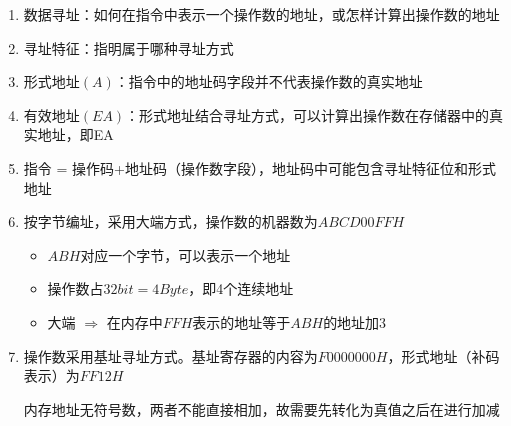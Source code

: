 \documentclass[a4paper,12pt]{article}
\begin{document}
    \begin{enumerate}
        \item 数据寻址：如何在指令中表示一个操作数的地址，或怎样计算出操作数的地址
        \item 寻址特征：指明属于哪种寻址方式
        \item 形式地址$(A)$：指令中的地址码字段并不代表操作数的真实地址
        \item 有效地址$(EA)$：形式地址结合寻址方式，可以计算出操作数在存储器中的真实地址，即EA
        \item 指令 = 操作码+地址码（操作数字段），地址码中可能包含寻址特征位和形式地址
        \item 按字节编址，采用大端方式，操作数的机器数为$ABCD 00FFH$
        \begin{itemize}
            \item $ABH$对应一个字节，可以表示一个地址
            \item 操作数占$32bit = 4Byte$，即4个连续地址
            \item 大端 $\Rightarrow$ 在内存中$FFH$表示的地址等于$ABH$的地址加3
        \end{itemize}
        \item {\color{red}{内存地址是无符号数}}
        \begin{analysisbox}
            操作数采用基址寻址方式。基址寄存器的内容为$F000 0000H$，形式地址（补码表示）为$FF12H$

            内存地址无符号数，两者不能直接相加，故需要先转化为真值之后在进行加减
        \end{analysisbox}
    \end{enumerate}
\end{document}
